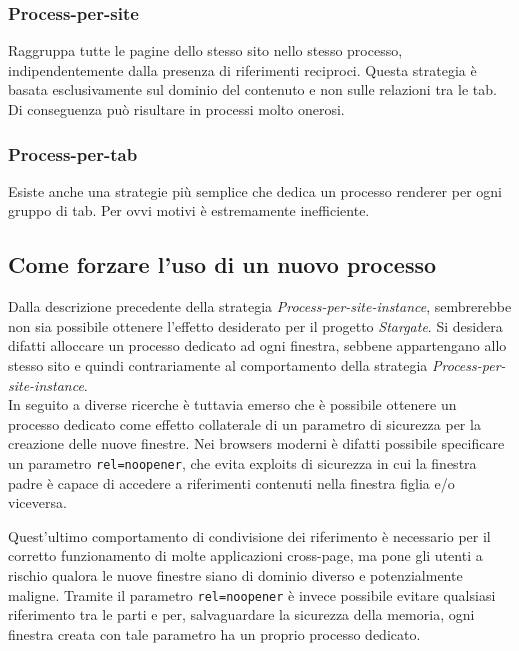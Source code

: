 \subsubsection{Process-per-site}

Raggruppa tutte le pagine dello stesso sito nello stesso processo, indipendentemente dalla presenza di riferimenti reciproci. Questa strategia è basata esclusivamente sul dominio del contenuto e non sulle relazioni tra le tab. Di conseguenza può risultare in processi molto onerosi.

\subsubsection{Process-per-tab}

Esiste anche una strategie più semplice che dedica un processo renderer per ogni gruppo di tab. Per ovvi motivi è estremamente inefficiente.

\subsection{Come forzare l'uso di un nuovo processo}\label{forzare-processo}

Dalla descrizione precedente della strategia \textit{Process-per-site-instance}, sembrerebbe non sia possibile ottenere l'effetto desiderato per il progetto \textit{Stargate}. Si desidera difatti alloccare un processo dedicato ad ogni finestra, sebbene appartengano allo stesso sito e quindi contrariamente al comportamento della strategia \textit{Process-per-site-instance}. \\

In seguito a diverse ricerche è tuttavia emerso che è possibile ottenere un processo dedicato come effetto collaterale di un parametro di sicurezza per la creazione delle nuove finestre. Nei browsers moderni è difatti possibile specificare un parametro \texttt{rel=noopener}, che evita exploits di sicurezza in cui la finestra padre è capace di accedere a riferimenti contenuti nella finestra figlia e/o viceversa. 

Quest'ultimo comportamento di condivisione dei riferimento è necessario per il corretto funzionamento di molte applicazioni cross-page, ma pone gli utenti a rischio qualora le nuove finestre siano di dominio diverso e potenzialmente maligne. Tramite il parametro \texttt{rel=noopener} è invece possibile evitare qualsiasi riferimento tra le parti e per, salvaguardare la sicurezza della memoria, ogni finestra creata con tale parametro ha un proprio processo dedicato. \\

